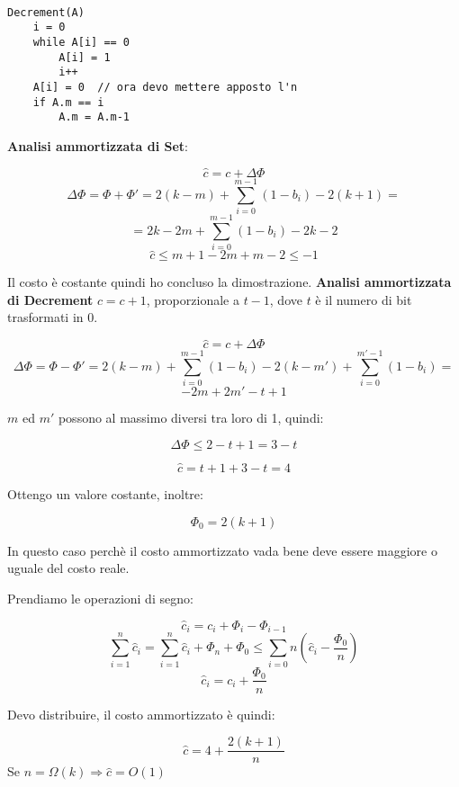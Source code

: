 \begin{lstlisting}

Decrement(A)
	i = 0
	while A[i] == 0
		A[i] = 1
		i++
	A[i] = 0  // ora devo mettere apposto l'n
	if A.m == i
		A.m = A.m-1

\end{lstlisting}

\textbf{Analisi ammortizzata di Set}:

$$\hat{c}=c+\Delta\Phi$$
$$\Delta\Phi=\Phi+\Phi'=2(k-m)+\sum_{i=0}^{m-1}(1-b_i)-2(k+1)=$$
$$=2k-2m+\sum_{i=0}^{m-1}(1-b_i)-2k-2$$
$$\hat{c}\le m+1-2m+m-2 \le -1$$

Il costo è costante quindi ho concluso la dimostrazione.
\linebreak
\linebreak
\textbf{Analisi ammortizzata di Decrement}
\linebreak
\linebreak
$c=c+1$, proporzionale a $t-1$, dove $t$ è il numero di bit trasformati in 0.

$$\hat{c}=c+\Delta\Phi$$
$$\Delta\Phi=\Phi-\Phi'=2(k-m)+\sum_{i=0}^{m-1}(1-b_i)-2(k-m')+\sum_{i=0}^{m'-1}(1-b_i)=$$
$$-2m+2m'-t+1$$

$m$ ed $m'$ possono al massimo diversi tra loro di 1, quindi:

$$\Delta\Phi\le 2-t+1=3-t$$

$$\hat{c}=t+1+3-t=4$$

Ottengo un valore costante, inoltre:

$$\Phi_0=2(k+1)$$

In questo caso perchè il costo ammortizzato vada bene deve essere maggiore o uguale del costo reale.

Prendiamo le operazioni di segno:

$$\hat{c}_i=c_i+\Phi_i-\Phi_{i-1}$$
$$\sum_{i=1}^n\hat{c}_i=\sum_{i=1}^n\hat{c}_i+\Phi_n+\Phi_0\le\sum_{i=0}{n}(\hat{c}_i-\frac{\Phi_0}{n})$$
$$\hat{c}_i=c_i+\frac{\Phi_0}{n}$$

Devo distribuire, il costo ammortizzato è quindi:

$$\hat{c}=4+\frac{2(k+1)}{n}$$
Se $n=\Omega(k) \Rightarrow \hat{c}=O(1)$
